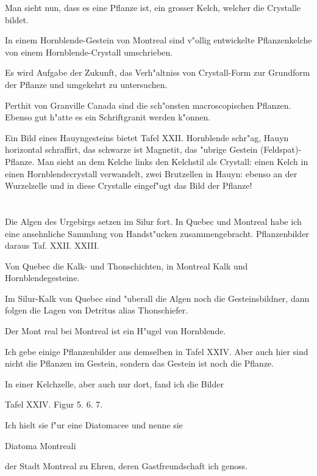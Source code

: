 \documentclass[a4paper, 11pt, oneside, german]{article}
\begin{document}
Man sieht nun, dass es eine Pflanze ist, ein grosser Kelch, welcher die Crystalle bildet.

In einem Hornblende-Gestein von Montreal sind v"ollig entwickelte Pflanzenkelche von einem Hornblende-Crystall umschrieben.

Es wird Aufgabe der Zukunft, das Verh"altniss von Crystall-Form zur Grundform der Pflanze und umgekehrt zu untersuchen.

Perthit von Granville Canada sind die sch"onsten macroscopischen Pflanzen. Ebenso gut h"atte es ein Schriftgranit werden k"onnen.

Ein Bild eines Hauyngesteins bietet Tafel XXII. Hornblende schr"ag, Hauyn horizontal schraffirt, das schwarze ist Magnetit, das "ubrige Gestein (Feldspat)-Pflanze. Man sieht an dem Kelche links den Kelchstil als Crystall: einen Kelch in einen Hornblendecrystall verwandelt, zwei Brutzellen in Hauyn: ebenso an der Wurzelzelle und in diese Crystalle eingef"ugt das Bild der Pflanze!
\clearpage
\section{}
\paragraph{}
Die Algen des Urgebirgs setzen im Silur fort. In Quebec und Montreal habe ich eine ansehnliche Sammlung von Handst"ucken zusammengebracht. Pflanzenbilder daraus Taf. XXII. XXIII.

Von Quebec die Kalk- und Thonschichten, in Montreal Kalk und Hornblendegesteine.

Im Silur-Kalk von Quebec sind "uberall die Algen noch die Gesteinsbildner, dann folgen die Lagen von Detritus alias Thonschiefer.

Der Mont real bei Montreal ist ein H"ugel von Hornblende.

Ich gebe einige Pflanzenbilder aus demselben in Tafel XXIV. Aber auch hier sind nicht die Pflanzen im Gestein, sondern das Gestein ist noch die Pflanze.

In einer Kelchzelle, aber auch nur dort, fand ich die Bilder

Tafel XXIV. Figur 5. 6. 7.

Ich hielt sie f"ur eine Diatomacee und nenne sie

Diatoma Montreali

der Stadt Montreal zu Ehren, deren Gastfreundschaft ich genoss.
\end{document}
